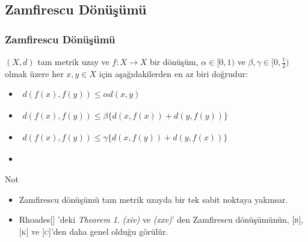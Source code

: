 \documentclass[sans,mathserif,8pt]{beamer}
\begin{document}
\subsection{Zamfirescu D\"{o}n\"{u}\c{s}\"{u}m\"{u}}
\begin{frame}
\frametitle{Zamfirescu D\"{o}n\"{u}\c{s}\"{u}m\"{u}}
 $(X,d)$  tam metrik uzay ve $f: X \rightarrow X$ bir d\"{o}n\"{u}\c{s}\"{u}m, $\alpha \in [0,1)$ ve $\beta , \gamma \in [0,\frac{1}{2}) $ olmak \"{u}zere her $x,y \in X$ i\c{c}in a\c{s}a\u{g}\i dakilerden en az biri do\u{g}rudur:

    \begin{itemize}
    \item $\begin{aligned} d(f(x), f(y))\leq \alpha d(x,y)
      \end{aligned}$
    \item
      $\begin{aligned} d(f(x), f(y))\leq \beta \big\{
        d(x,f(x))+d(y,f(y))\big\}
      \end{aligned}$

    \item
      $\begin{aligned} d(f(x), f(y))\leq \gamma \big\{
        d(x,f(y))+d(y,f(x))\big\}
      \end{aligned}$

    \item  
\end{itemize}

\begin{block}{Not}  
\begin{itemize}[<+-| alert@+>]  
\item Zamfirescu d\"{o}n\"{u}\c{s}\"{u}m\"{u} tam metrik uzayda bir tek sabit noktaya yak\i nsar.  
\item Rhoades[] 'deki \emph{Theorem 1}. \emph{(xiv)} ve \emph{(xxv)}' den   Zamfirescu d\"{o}n\"{u}\c{s}\"{u}m\"{u}n\"{u}n, \textsc{[b]}, \textsc{[k]} ve \textsc{[c]}'den daha genel oldu\u{g}u g\"or\"ul\"ur.
\end{itemize}



\end{block}
\end{frame}%
\end{document}
